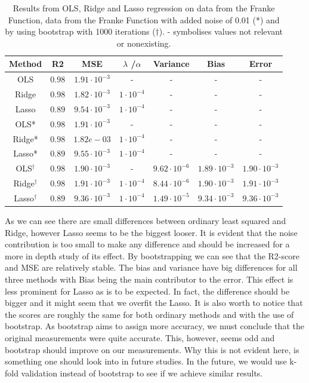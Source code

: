 \documentclass[12pt]{article}
\newcommand{\E}[1]{\cdot 10^{#1}}
\begin{document}
\begin{table}[H]
\centering
\begin{tabular}{c|c|c|c|c|c|c}
Method & R2 & MSE & $\lambda$ /$\alpha$ & Variance & Bias & Error \\ \hline
OLS & $0.98$ & $1.91\E{-3}$ & -  & - & - & -  \\ \hline
Ridge & $0.98$ & $1.82\E{-3}$ & $1\E{-4}$ & - & - & -  \\ \hline
Lasso & $0.89$ & $9.54\E{-3}$ & $1\E{-4}$ & - & - & -  \\ \hline
OLS* & $0.98$ & $1.91\E{-3}$ & - & - & - & -  \\ \hline
Ridge* &  $0.98$ & $1.82e-03$ & $1\E{-4}$ & - & - & -  \\ \hline
Lasso* &$0.89$ & $9.55\E{-3}$ & $1\E{-4}$ & - & - & -  \\ \hline
OLS$^{\dagger}$ & $0.98$ & $1.90\E{-3}$ & - & $9.62\E{-6}$ & $1.89\E{-3}$ & $1.90\E{-3}$ \\ \hline
Ridge$^{\dagger}$ & $0.98$ & $1.91\E{-3}$ & $1\E{-4}$ & $8.44\E{-6}$ & $1.90\E{-3}$ & $1.91\E{-3}$  \\ \hline
Lasso$^{\dagger}$ & $0.89$ & $9.36\E{-3}$ & $1\E{-4}$ & $1.49\E{-5}$ & $9.34\E{-3}$ & $9.36\E{-3}$   \\ \hline
\end{tabular}
\caption{Results from OLS, Ridge and Lasso regression on data from the Franke Function, data from the Franke Function with added noise of 0.01 (*) and by using bootstrap with 1000 iterations ($\dagger$). - symbolises values not relevant or nonexisting.}
\label{tabRD:abc}
\end{table}
As we can see there are small differences between ordinary least squared and Ridge, however Lasso seems to be the biggest looser. It is evident that the noise contribution is too small to make any difference and should be increased for a more in depth study of its effect. By bootstrapping we can see that the R2-score and MSE are relatively stable. The bias and variance have big differences for all three methods with Bias being the main contributor to the error. This effect is less prominent for Lasso as is to be expected. In fact, the difference should be bigger and it might seem that we overfit the Lasso. It is also worth to notice that the scores are roughly the same for both ordinary methods and with the use of bootstrap. As bootstrap aims to assign more accuracy, we must conclude that the original measurements were quite accurate. This, however, seems odd and bootstrap should improve on our measurements. Why this is not evident here, is something one should look into in future studies. In the future, we would use k-fold validation instead of bootstrap to see if we achieve similar results.\\ \\
\end{document}
